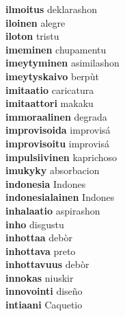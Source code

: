 \textbf{ilmoitus } deklarashon \\
\textbf{iloinen } alegre \\
\textbf{iloton } tristu \\
\textbf{imeminen } chupamentu \\
\textbf{imeytyminen } asimilashon \\
\textbf{imeytyskaivo } berpùt \\
\textbf{imitaatio } caricatura \\
\textbf{imitaattori } makaku \\
\textbf{immoraalinen } degrada \\
\textbf{improvisoida } improvisá \\
\textbf{improvisoitu } improvisá \\
\textbf{impulsiivinen } kaprichoso \\
\textbf{imukyky } absorbacion \\
\textbf{indonesia } Indones \\
\textbf{indonesialainen } Indones \\
\textbf{inhalaatio } aspirashon \\
\textbf{inho } disgustu \\
\textbf{inhottaa } debòr \\
\textbf{inhottava } preto \\
\textbf{inhottavuus } debòr \\
\textbf{innokas } niuskir \\
\textbf{innovointi } diseño \\
\textbf{intiaani } Caquetio \\
